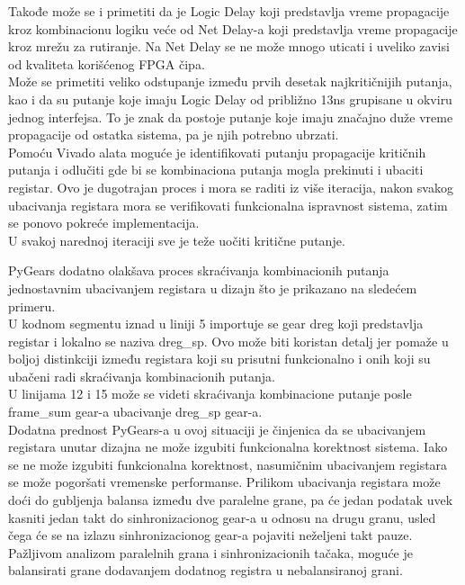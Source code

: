 Takođe može se i primetiti da je Logic Delay koji predstavlja vreme propagacije
kroz kombinacionu logiku veće od Net Delay-a koji predstavlja vreme
propagacije kroz mrežu za rutiranje.
Na Net Delay se ne može mnogo uticati i uveliko zavisi od kvaliteta korišćenog
FPGA čipa. \\

Može se primetiti veliko odstupanje između prvih desetak najkritičnijih putanja,
kao i da su putanje koje imaju Logic Delay od približno 13ns grupisane u okviru
jednog interfejsa.
To je znak da postoje putanje koje imaju značajno duže vreme propagacije od
ostatka sistema, pa je njih potrebno ubrzati. \\
Pomoću Vivado alata moguće je identifikovati putanju propagacije kritičnih
putanja i odlučiti gde bi se kombinaciona putanja mogla prekinuti i ubaciti
registar.
Ovo je dugotrajan proces i mora se raditi iz više iteracija, nakon svakog
ubacivanja registara mora se verifikovati funkcionalna ispravnost sistema, zatim
se ponovo pokreće implementacija. \\
U svakoj narednoj iteraciji sve je teže uočiti kritične putanje. \\

\newpage

PyGears dodatno olakšava proces skraćivanja kombinacionih putanja jednostavnim
ubacivanjem registara u dizajn što je prikazano na sledećem primeru. \\



U kodnom segmentu iznad u liniji 5 importuje se gear dreg koji predstavlja
registar i lokalno se naziva dreg\_sp.
Ovo može biti koristan detalj jer pomaže u boljoj distinkciji između registara
koji su prisutni funkcionalno i onih koji su ubačeni radi skraćivanja
kombinacionih putanja. \\
U linijama 12 i 15 može se videti skraćivanja kombinacione putanje posle
frame\_sum gear-a ubacivanje dreg\_sp gear-a. \\

Dodatna prednost PyGears-a u ovoj situaciji je činjenica da se ubacivanjem
registara unutar dizajna ne može izgubiti funkcionalna korektnost sistema.
Iako se ne može izgubiti funkcionalna korektnost, nasumičnim ubacivanjem
registara se može pogoršati vremenske performanse.
Prilikom ubacivanja registara može doći do gubljenja balansa između dve
paralelne grane, pa će jedan podatak uvek kasniti jedan takt do sinhronizacionog
gear-a u odnosu na drugu granu, usled čega će se na izlazu sinhronizacionog
gear-a pojaviti neželjeni takt pauze.
Pažljivom analizom paralelnih grana i sinhronizacionih tačaka, moguće je
balansirati grane dodavanjem dodatnog registra u nebalansiranoj grani. \\

